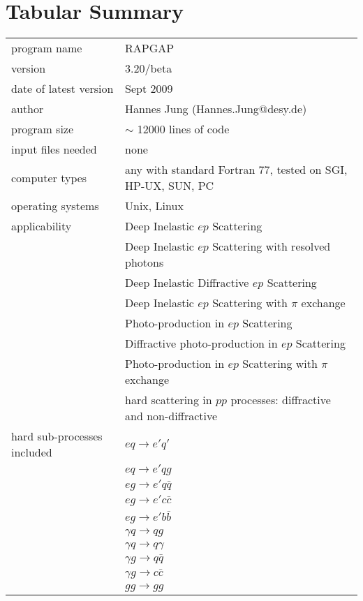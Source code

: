 \documentclass[10pt]{article} \usepackage{dina4}
\begin{document}
\section{Tabular Summary}
\begin{tabular}{l l}
 program name & RAPGAP \\
 version      & 3.20/beta    \\
 date of latest version& Sept 2009 \\
 author      &  Hannes Jung (Hannes.Jung@desy.de)\\
 program size & $\sim$ 12000 lines of code\\
 input files needed & none          \\
 computer types & any with standard Fortran 77, tested on 
                 SGI, HP-UX, SUN, PC\\
 operating systems & Unix, Linux\\
 applicability & Deep Inelastic $ep$ Scattering \\
               & Deep Inelastic $ep$ Scattering with resolved photons\\
               & Deep Inelastic Diffractive $ep$ Scattering \\
               & Deep Inelastic $ep$ Scattering with $\pi$ exchange\\
               & Photo-production in $ep$ Scattering \\
               & Diffractive photo-production in $ep$ Scattering \\
               & Photo-production in $ep$ Scattering with $\pi$ exchange\\
               & hard scattering in $pp$ processes:  diffractive and
		   non-diffractive\\
  hard sub-processes included
  &  $  e q \rightarrow  e' q' $\\
  &  $  e q \rightarrow  e' q g $\\
  &  $  e g \rightarrow  e' q \bar{q} $\\
  &  $  e g \rightarrow  e' c \bar{c} $\\
  &  $  e g \rightarrow  e' b \bar{b} $\\
  &  $  \gamma q \rightarrow  q g $\\
  &  $  \gamma q \rightarrow  q \gamma $\\
  &  $  \gamma g \rightarrow  q \bar{q} $\\
  &  $  \gamma g \rightarrow  c \bar{c} $\\
  &  $ g g \rightarrow gg $ \\

\end{tabular}
\end{document}
